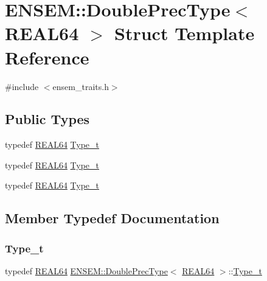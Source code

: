 \hypertarget{structENSEM_1_1DoublePrecType_3_01REAL64_01_4}{}\section{E\+N\+S\+EM\+:\+:Double\+Prec\+Type$<$ R\+E\+A\+L64 $>$ Struct Template Reference}
\label{structENSEM_1_1DoublePrecType_3_01REAL64_01_4}


{\ttfamily \#include $<$ensem\+\_\+traits.\+h$>$}

\subsection*{Public Types}
\begin{DoxyCompactItemize}
\item 
typedef \mbox{\hyperlink{namespaceENSEM_a85b215b9f1f43715aebee01718e25082}{R\+E\+A\+L64}} \mbox{\hyperlink{structENSEM_1_1DoublePrecType_3_01REAL64_01_4_aa802de703a59b214ae8bb817ec704252}{Type\+\_\+t}}
\item 
typedef \mbox{\hyperlink{namespaceENSEM_a85b215b9f1f43715aebee01718e25082}{R\+E\+A\+L64}} \mbox{\hyperlink{structENSEM_1_1DoublePrecType_3_01REAL64_01_4_aa802de703a59b214ae8bb817ec704252}{Type\+\_\+t}}
\item 
typedef \mbox{\hyperlink{namespaceENSEM_a85b215b9f1f43715aebee01718e25082}{R\+E\+A\+L64}} \mbox{\hyperlink{structENSEM_1_1DoublePrecType_3_01REAL64_01_4_aa802de703a59b214ae8bb817ec704252}{Type\+\_\+t}}
\end{DoxyCompactItemize}


\subsection{Member Typedef Documentation}
\mbox{\label{structENSEM_1_1DoublePrecType_3_01REAL64_01_4_aa802de703a59b214ae8bb817ec704252}} 
\subsubsection{\texorpdfstring{Type\_t}{Type\_t}\hspace{0.1cm}{\footnotesize\ttfamily [1/3]}}
{\footnotesize\ttfamily typedef \mbox{\hyperlink{namespaceENSEM_a85b215b9f1f43715aebee01718e25082}{R\+E\+A\+L64}} \mbox{\hyperlink{structENSEM_1_1DoublePrecType}{E\+N\+S\+E\+M\+::\+Double\+Prec\+Type}}$<$ \mbox{\hyperlink{namespaceENSEM_a85b215b9f1f43715aebee01718e25082}{R\+E\+A\+L64}} $>$\+::\mbox{\hyperlink{structENSEM_1_1DoublePrecType_3_01REAL64_01_4_aa802de703a59b214ae8bb817ec704252}{Type\+\_\+t}}}

